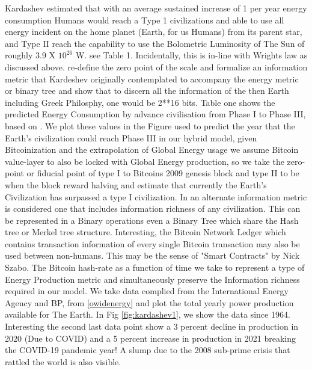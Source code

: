 \documentclass[final,5p,times,twocolumn,authoryear]{elsarticle}
\begin{document}
Kardashev estimated that with an average sustained increase of 1 \percent per year energy consumption Humans would reach a Type 1 civilizations and able to use all energy incident on the home planet (Earth, for us Humans) from its parent star, and Type II reach the capability to use the Bolometric Luminosity of The Sun of roughly 3.9 X $10^{26}$ W. see Table 1. Incidentally, this is in-line with Wrights law as  discussed above. \cite{Sagan73} re-define the zero point of the scale and formalize an information metric that Kardeshev originally contemplated to accompany the energy metric or binary tree and show that to discern all the information of the then Earth including Greek Philosphy, one would be 2**16 bits. Table one shows the predicted Energy Consumption by advance civilisation from Phase I to Phase III, based on \cite{kar64}. We plot these values in the Figure  used to predict the year that the Earth's civilization could reach Phase III in our hybrid model, given Bitcoinization and the extrapolation of Global Energy usage we assume Bitcoin value-layer to also be locked with Global Energy production, so we take the zero-point or fiducial point of type I to Bitcoins 2009 genesis block and type II to be when the block reward halving and estimate that currently the Earth's Civilization has surpassed a type I civilization. In \cite{Sagan73} an alternate information metric is considered one that includes information richness of any civilization. This can be represented in a Binary operations even a Binary Tree which share the Hash tree or Merkel tree structure. Interesting, the Bitcoin Network Ledger which contains transaction information of every single Bitcoin transaction may also be used between non-humans. This may be the sense of "Smart Contracts" by Nick Szabo. The Bitcoin hash-rate as a function of time we take to represent a type of Energy Production metric and simultaneously preserve the Information richness required in our model. We take data complied from the International Energy Agency and BP, from \ref{owidenergy} and plot the total yearly power production available for The Earth. In Fig \ref{fig:kardashev1}, we show the data since 1964. Interesting the second last data point show a 3 percent decline in production in 2020 (Due to COVID) and a 5 percent increase in production in 2021 breaking the COVID-19 pandemic year! A slump due to the 2008 sub-prime crisis that rattled the world is also visible.
\end{document}
